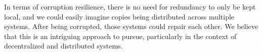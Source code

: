 \documentclass[a4paper,11pt,oneside]{report}
\begin{document}
In terms of corruption resilience, there is no need for redundancy to only be kept local, and we could easily imagine copies being distributed across multiple systems. After being corrupted, those systems could repair each other. We believe that this is an intriguing approach to pursue, particularly in the context of decentralized and distributed systems.

\newpage
\cleardoublepage
{}
{}
\printbibliography

\newpage

%
%
\end{document}
